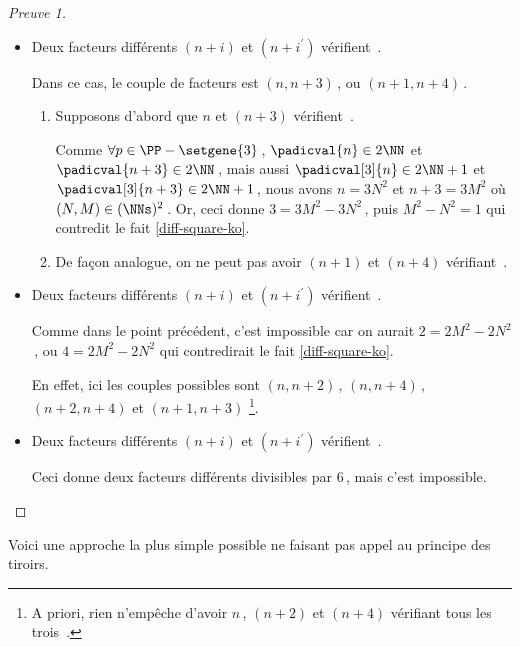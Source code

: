 \begin{proof}[Preuve 1]
\begin{itemize}
    	\medskip
		\item Deux facteurs différents $(n+i)$ et $(n+i^\prime)$ vérifient \,.
		
		\smallskip
		\noindent
		Dans ce cas, le couple de facteurs est $(n, n + 3)$\,, ou $(n + 1, n + 4)$\,.    
		\begin{enumerate}
			\item Supposons d'abord que $n$ et $(n+3)$ vérifient \,.
			
			\noindent
			Comme $\forall p \in \PP - \setgene{3}$\,, $\padicval{n} \in 2 \NN$ et $\padicval{n + 3} \in 2 \NN$\,,
			mais aussi $\padicval[3]{n} \in 2 \NN + 1$ et $\padicval[3]{n + 3} \in 2 \NN + 1$\,,
			nous avons $n = 3 N^2$ et $n+3 = 3 M^2$ où $(N, M) \in ( \NNs )^2$\,.
			Or, ceci donne $3 = 3 M^2 - 3 N^2$\,, puis $M^2 - N^2 = 1$ qui contredit le fait \ref{diff-square-ko}.

			\item De façon analogue, on ne peut pas avoir $(n+1)$ et $(n+4)$ vérifiant \,.
		\end{enumerate}


    	\medskip
		\item Deux facteurs différents $(n+i)$ et $(n+i^\prime)$ vérifient \,.
		
		\smallskip
		\noindent
		Comme dans le point précédent, c'est impossible car on aurait $2 = 2 M^2 - 2 N^2$\,, ou $4 = 2 M^2 - 2 N^2$ qui contredirait le fait \ref{diff-square-ko}. 
		
		\smallskip
		
		\noindent
		En effet, ici les couples possibles sont $(n, n + 2)$\,, $(n, n + 4)$\,,  $(n + 2, n + 4)$ et $(n + 1, n + 3)$
		\footnote{
			A priori, rien n'empêche d'avoir $n$\,, $(n + 2)$ et $(n + 4)$ vérifiant tous les trois \,.
		}.


    	\medskip
		\item Deux facteurs différents $(n+i)$ et $(n+i^\prime)$ vérifient \,.
		
		\smallskip
		\noindent
		Ceci donne deux facteurs différents divisibles par $6$\,, mais c'est impossible. \qedhere
    \end{itemize}
\end{proof}




Voici une approche la plus simple possible ne faisant pas appel au principe des tiroirs.


